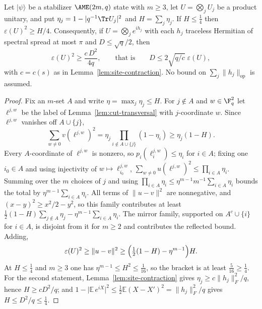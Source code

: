 \begin{theorem}
\label{thm:budget-free-stability}
Let \(\lvert\psi\rangle\) be a stabilizer \(\AME(2m,q)\) state with
\(m\geq3\), let \(U=\bigotimes_jU_j\) be a product unitary, and put
\(\eta_j=1-\lvert q^{-1}\Tr U_j\rvert^2\) and \(H=\sum_j\eta_j\).  If
\(H\leq\frac14\) then \(\varepsilon(U)^2\geq H/4\).  Consequently, if
\(U=\bigotimes_je^{ih_j}\) with each \(h_j\) traceless Hermitian of
spectral spread at most \(\pi\) and \(D\leq\sqrt q/2\), then
\[
 \varepsilon(U)^2\geq\frac{c\,D^2}{4q},
 \qquad\text{that is}\qquad
 D\leq2\sqrt{q/c}\;\varepsilon(U),
\]
with \(c=c(s)\) as in Lemma~\ref{lem:site-contraction}.  No bound on
\(\sum_j\lVert h_j\rVert_{\mathrm{op}}\) is assumed.
\end{theorem}

\begin{proof}
Fix an \(m\)-set \(A\) and write \(\eta=\max_j\eta_j\leq H\).  For
\(j\notin A\) and \(w\in\F_q^2\) let \(\ell^{j,w}\) be the label of
Lemma~\ref{lem:cut-transversal} with \(j\)-coordinate \(w\).  Since
\(\ell^{j,w}\) vanishes off \(A\cup\{j\}\),
\[
 \sum_{w\ne0}v(\ell^{j,w})^2
  =\eta_j\prod_{i\notin A\cup\{j\}}(1-\eta_i)\geq\eta_j(1-H).
\]
Every \(A\)-coordinate of \(\ell^{j,w}\) is nonzero, so
\(p_i(\ell_i^{j,w})\leq\eta_i\) for \(i\in A\); fixing one \(i_0\in A\) and
using injectivity of \(w\mapsto\ell_{i_0}^{j,w}\),
\(\sum_{w\ne0}u(\ell^{j,w})^2\leq\prod_{i\in A}\eta_i\).  Summing over the
\(m\) choices of \(j\) and using
\(\prod_{i\in A}\eta_i\leq\eta^{m-1}m^{-1}\sum_{i\in A}\eta_i\) bounds the
total by \(\eta^{m-1}\sum_{i\in A}\eta_i\).  All terms of
\(\lVert u-v\rVert^2\) are nonnegative, and \((x-y)^2\geq x^2/2-y^2\), so
this family contributes at least
\(\frac12(1-H)\sum_{j\notin A}\eta_j-\eta^{m-1}\sum_{i\in A}\eta_i\).  The
mirror family, supported on \(A^c\cup\{i\}\) for \(i\in A\), is disjoint
from it for \(m\geq2\) and contributes the reflected bound.  Adding,
\[
 \varepsilon(U)^2\geq\lVert u-v\rVert^2
   \geq\Bigl(\tfrac12(1-H)-\eta^{m-1}\Bigr)H .
\]
At \(H\leq\frac14\) and \(m\geq3\) one has
\(\eta^{m-1}\leq H^2\leq\frac1{16}\), so the bracket is at least
\(\frac5{16}\geq\frac14\).  For the second statement,
Lemma~\ref{lem:site-contraction} gives
\(\eta_j\geq c\lVert h_j\rVert_F^2/q\), hence \(H\geq cD^2/q\); and
\(1-\lvert\mathbb E\,e^{iX}\rvert^2\leq\frac12\mathbb E(X-X')^2
=\lVert h_j\rVert_F^2/q\) gives \(H\leq D^2/q\leq\frac14\).
\end{proof}


